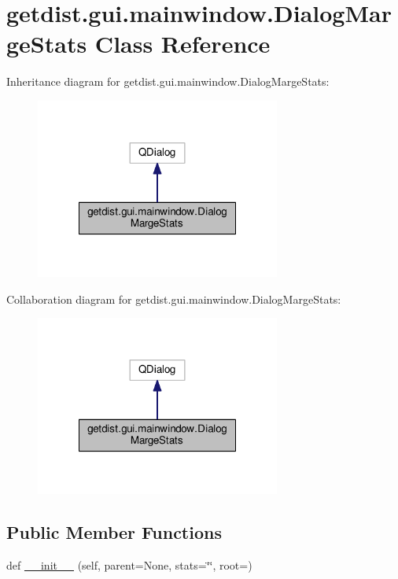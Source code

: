 \hypertarget{classgetdist_1_1gui_1_1mainwindow_1_1DialogMargeStats}{}\section{getdist.\+gui.\+mainwindow.\+Dialog\+Marge\+Stats Class Reference}
\label{classgetdist_1_1gui_1_1mainwindow_1_1DialogMargeStats}


Inheritance diagram for getdist.\+gui.\+mainwindow.\+Dialog\+Marge\+Stats\+:
\nopagebreak
\begin{figure}[H]
\begin{center}
\leavevmode
\includegraphics[width=228pt]{classgetdist_1_1gui_1_1mainwindow_1_1DialogMargeStats__inherit__graph}
\end{center}
\end{figure}


Collaboration diagram for getdist.\+gui.\+mainwindow.\+Dialog\+Marge\+Stats\+:
\nopagebreak
\begin{figure}[H]
\begin{center}
\leavevmode
\includegraphics[width=228pt]{classgetdist_1_1gui_1_1mainwindow_1_1DialogMargeStats__coll__graph}
\end{center}
\end{figure}
\subsection*{Public Member Functions}
\begin{DoxyCompactItemize}
\item 
def \mbox{\hyperlink{classgetdist_1_1gui_1_1mainwindow_1_1DialogMargeStats_a15ddea2c2c3c162cf43a8d023115a967}{\+\_\+\+\_\+init\+\_\+\+\_\+}} (self, parent=None, stats=\char`\"{}\char`\"{}, root=\textquotesingle{}\textquotesingle{})
\end{DoxyCompactItemize}
